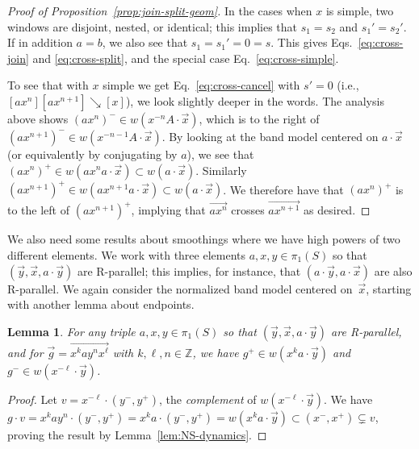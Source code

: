 \documentclass[11pt]{amsart}
\newcommand{\ora}[1]{\overrightarrow{#1}}
\numberwithin{equation}{section}
\numberwithin{figure}{section}
\newtheorem{lemma}[theorem]{Lemma}
\theoremstyle{definition}
\theoremstyle{plain}
\newcommand\bbZ{\ensuremath{\mathbb{Z}}}
\newcommand{\reducesto}{\mathrel{\searrow}}
\begin{document}
\begin{proof}[Proof of Proposition~\ref{prop:join-split-geom}]
  In the cases when $x$ is simple, two windows are disjoint, nested,
  or identical; this implies that $s_1 = s_2$ and $s_1' = s_2'$.
  If in
  addition $a=b$, we also see that $s_1=s_1'=0=s$. This gives Eqs.\
  \eqref{eq:cross-join} and \eqref{eq:cross-split}, and the special
  case Eq.\ \eqref{eq:cross-simple}.

  To see that with $x$ simple we get Eq.\ \eqref{eq:cross-cancel} with
  $s'=0$ (i.e., $[ax^n][ax^{n+1}] \reducesto [x]$), we look slightly deeper
  in the words. The analysis above shows $(ax^n)^- \in
  w(x^{-n}A\cdot\ora{x})$, which is to the right of
  $(ax^{n+1})^- \in w(x^{-n-1}A\cdot\ora{x})$. By
  looking at the band model centered on $a \cdot \ora{x}$ (or
  equivalently by conjugating by $a$), we see that
  $(ax^n)^+ \in w(ax^na\cdot\ora{x}) \subset w(a\cdot\ora{x})$. Similarly
  $(ax^{n+1})^+ \in w(ax^{n+1}a\cdot\ora{x}) \subset
  w(a\cdot\ora{x})$. We therefore have that $(ax^n)^+$ is to the left
  of $(ax^{n+1})^+$, implying that $\ora{ax^n}$ crosses $\ora{ax^{n+1}}$ as
  desired.
\end{proof}

We also need some results about smoothings where we have high powers of
two different elements. We work with three elements $a,x,y\in\pi_1(S)$
so that $(\ora{y},\ora{x},a\cdot\ora{y})$ are R-parallel; this
implies, for instance, that $(a\cdot\ora{y},a\cdot\ora{x})$ are also
R-parallel.
We again consider the normalized band model
centered on~$\ora{x}$, starting with another lemma about endpoints.

\begin{lemma}\label{lem:ayx-window}
  For any triple $a,x,y\in\pi_1(S)$ so that
  $(\ora{y},\ora{x},a\cdot\ora{y})$ are R-parallel, and for
  $\ora{g}=\ora{x^k ay^n x^\ell}$ with $k,\ell,n\in\bbZ$, we have
  $g^+ \in w(x^k a \cdot\ora{y})$ and
  $g^- \in w(x^{-\ell}\cdot\ora{y})$.
\end{lemma}

\begin{proof}
  Let $v = x^{-\ell} \cdot (y^-,y^+)$, the \emph{complement}
  of $w(x^{-\ell} \cdot \ora{y})$.
  We have
  $g \cdot v = x^k ay^n \cdot(y^-,y^+) = x^k a\cdot (y^-,y^+) = w(x^k a \cdot
  \ora{y}) \subset (x^-,x^+) \subsetneq v$,
  proving the result by Lemma~\ref{lem:NS-dynamics}.
\end{proof}
\end{document}
